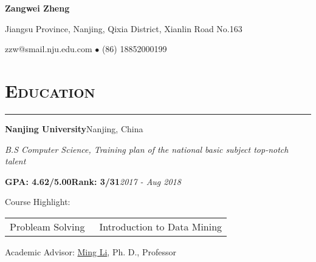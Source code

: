 \documentclass[letterpaper]{article}
\def\name{Zangwei Zheng}
\renewenvironment{itemize}{
  \begin{list}{}{
    \setlength{\leftmargin}{1.5em}
  }
}{
  \end{list}
}
\begin{document}

\centerline{\huge \bf \name}
\vspace{-0.1in}
\begin{itemize}
  \setlength{\itemsep}{-3pt}
  \centering
  \item[$\bullet$] Jiangsu Province, Nanjing, Qixia District, Xianlin Road No.163
  \item[$\bullet$] zzw@smail.nju.edu.com $\bullet$ (86) 18852000199
\end{itemize}


\section*{\textsc{Education}}
\noindent\rule[10pt]{\textwidth}{0.2pt}\vspace{-30pt}
\begin{itemize}
  \setlength{\itemsep}{-2pt}
  \item {\bfseries Nanjing University}\hfill Nanjing, China
  \item {\it B.S Computer Science, Training plan of the national basic subject top-notch talent}
  \vspace{-6pt} 
  \begin{itemize}
    \setlength{\itemsep}{-2pt}
    \item[$\circ$] {\bfseries GPA: 4.62/5.00\hspace{0.25\textwidth}Rank: 3/31}\hfill {\it 2017 - Aug 2018}
    \item[$\circ$] Course Highlight: \begin{tabular}{ll}
               Probleam Solving & \ Introduction to Data Mining
    \end{tabular}
    \item[$\circ$] Academic Advisor: \href{http://cs.nju.edu.cn/lim/}{Ming Li}, Ph. D., Professor
  \end{itemize}

\end{itemize}
\end{document}
